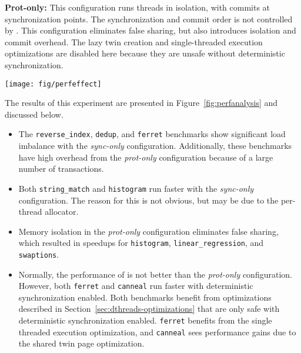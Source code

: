 \textbf{Prot-only:}
This configuration runs threads in isolation, with commits at synchronization points.  The synchronization and commit order is not controlled by \dthreads{}.  This configuration eliminates false sharing, but also introduces isolation and commit overhead.  The lazy twin creation and single-threaded execution optimizations are disabled here because they are unsafe without deterministic synchronization.

\begin{figure*}[!t]
{\centering
\texttt{[image: fig/perfeffect]}
\caption{
	Normalized execution time with respect to \pthreads{} (lower is better) for three configurations.  The \emph{sync-only} and \emph{prot-only} configurations are described in Section~\ref{sec:investigation}.
	\label{fig:perfanalysis}}
}
\end{figure*}

The results of this experiment are presented in Figure~\ref{fig:perfanalysis} and discussed below.

\begin{itemize}
	\item
		The \texttt{reverse\_index}, \texttt{dedup}, and \texttt{ferret} benchmarks show significant load imbalance with the {\em sync-only} configuration.  Additionally, these benchmarks have high overhead from the {\em prot-only} configuration because of a large number of transactions.
	
	\item
		Both \texttt{string\_match} and \texttt{histogram} run faster with the {\em sync-only} configuration.  The reason for this is not obvious, but may be due to the per-thread allocator.
	
	\item
		Memory isolation in the {\em prot-only} configuration eliminates false sharing, which resulted in speedups for \texttt{histogram}, \texttt{linear\_regression}, and \texttt{swaptions}.

	\item
		Normally, the performance of \dthreads{} is not better than the {\em prot-only} configuration.  However, both \texttt{ferret} and \texttt{canneal} run faster with deterministic synchronization enabled.  Both benchmarks benefit from optimizations described in Section~\ref{sec:dthreads-optimizations} that are only safe with deterministic synchronization enabled.  \texttt{ferret} benefits from the single threaded execution optimization, and \texttt{canneal} sees performance gains due to the shared twin page optimization.


\end{itemize}

